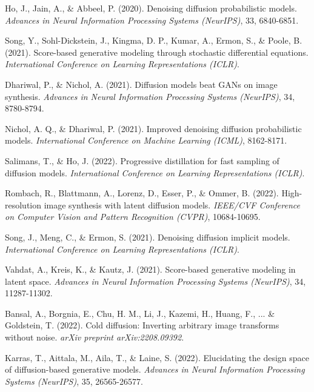 \documentclass[11pt,a4paper]{article}
\begin{document}

\begin{thebibliography}{99}

Ho, J., Jain, A., \& Abbeel, P. (2020).
Denoising diffusion probabilistic models.
\textit{Advances in Neural Information Processing Systems (NeurIPS)}, 33, 6840-6851.

Song, Y., Sohl-Dickstein, J., Kingma, D. P., Kumar, A., Ermon, S., \& Poole, B. (2021).
Score-based generative modeling through stochastic differential equations.
\textit{International Conference on Learning Representations (ICLR)}.

Dhariwal, P., \& Nichol, A. (2021).
Diffusion models beat GANs on image synthesis.
\textit{Advances in Neural Information Processing Systems (NeurIPS)}, 34, 8780-8794.

Nichol, A. Q., \& Dhariwal, P. (2021).
Improved denoising diffusion probabilistic models.
\textit{International Conference on Machine Learning (ICML)}, 8162-8171.

Salimans, T., \& Ho, J. (2022).
Progressive distillation for fast sampling of diffusion models.
\textit{International Conference on Learning Representations (ICLR)}.

Rombach, R., Blattmann, A., Lorenz, D., Esser, P., \& Ommer, B. (2022).
High-resolution image synthesis with latent diffusion models.
\textit{IEEE/CVF Conference on Computer Vision and Pattern Recognition (CVPR)}, 10684-10695.

Song, J., Meng, C., \& Ermon, S. (2021).
Denoising diffusion implicit models.
\textit{International Conference on Learning Representations (ICLR)}.

Vahdat, A., Kreis, K., \& Kautz, J. (2021).
Score-based generative modeling in latent space.
\textit{Advances in Neural Information Processing Systems (NeurIPS)}, 34, 11287-11302.

Bansal, A., Borgnia, E., Chu, H. M., Li, J., Kazemi, H., Huang, F., ... \& Goldstein, T. (2022).
Cold diffusion: Inverting arbitrary image transforms without noise.
\textit{arXiv preprint arXiv:2208.09392}.

Karras, T., Aittala, M., Aila, T., \& Laine, S. (2022).
Elucidating the design space of diffusion-based generative models.
\textit{Advances in Neural Information Processing Systems (NeurIPS)}, 35, 26565-26577.


\end{thebibliography}
\end{document}
